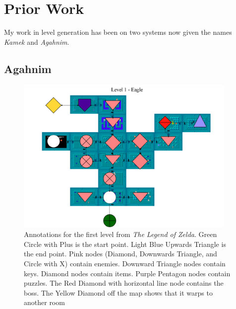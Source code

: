 \documentclass[12pt]{report}
\begin{document}
\section*{Prior Work}

My work in level generation has been on two systems now given the names \textit{Kamek} and \textit{Agahnim}.

\subsection*{Agahnim}

 \begin{figure}[htb!]
  \centering
    \includegraphics[width=0.95\textwidth]{figures/CopyOfLoz1.png}
  \caption{Annotations for the first level from \textit{The Legend of Zelda}. Green Circle with Plus is the start point. Light Blue Upwards Triangle is the end point. Pink nodes (Diamond, Downwards Triangle, and Circle with X) contain enemies. Downward Triangle nodes contain keys. Diamond nodes contain items. Purple Pentagon nodes contain puzzles. The Red Diamond with horizontal line node contains the boss. The Yellow Diamond off the map shows that it warps to another room}
  \label{fig:Copy_of_LoZ_1}
\end{figure}
\end{document}
